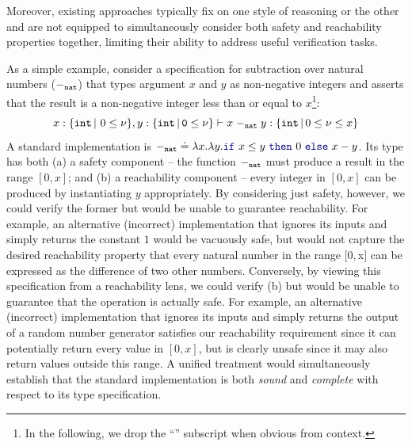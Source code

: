 Moreover, existing approaches typically fix on one style of reasoning
or the other and are not equipped to simultaneously consider both
safety and reachability properties together, limiting their ability to
address useful verification tasks.

As a simple example, consider a specification for subtraction over
natural numbers (${\tt -}_{{\tt nat}}$) that types argument $x$ and
$y$ as non-negative integers and asserts that the result is a
non-negative integer less than or equal to $x$\footnote{In the
  following, we drop the ``'' subscript when obvious from
  context.}:
  \[x : \{{\tt int}\, |\ 0 \leq \nu\}, y : {\tt \{{\tt int}\, |\, 0 \leq \nu \}}
      \vdash x\;{\tt -}_{{\tt nat}}\;y : \{{\tt int}\, |\, 0 \leq
      \nu \leq x \}\]
\noindent A standard implementation is $\Code{-}_{\Code{nat}} \doteq
\lambda x.\lambda y. \zif{x \leq y}{0}{x - y}$.  Its type has both (a)
a safety component -- the function ${\tt -}_{{\tt nat}}$ must
produce a result in the range $[0,x]$; and (b) a reachability
component -- every integer in $[0,x]$ can be produced by instantiating
$y$ appropriately.  By considering just safety, however, we could
verify the former but would be unable to guarantee reachability.  For
example, an alternative (incorrect) implementation that ignores its
inputs and simply returns the constant $1$ would be vacuously safe,
but would not capture the desired reachability property that every natural number
in the range $[0,$x$]$ can be expressed as the difference of two other numbers.  Conversely,
by viewing this specification from a reachability lens, we could
verify (b) but would be unable to guarantee that the operation is
actually safe.  For example, an alternative (incorrect) implementation
that ignores its inputs and simply returns the output of a random
number generator satisfies our reachability requirement since it can
potentially return every value in $[0, x]$, but is clearly unsafe
since it may also return values outside this range.  A unified
treatment would simultaneously establish that the standard
implementation is both \emph{sound} and \emph{complete} with respect
to its type specification.


